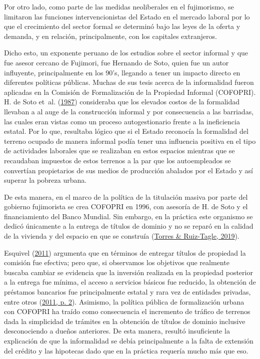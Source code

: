 \documentclass[
  letterpaper,
  12pt,
  oneside,
  spanish,
  doublespacing,
  headsepline,
  parskip]{MastersDoctoralThesis}
\begin{document}
Por otro lado, como parte de las medidas neoliberales en el fujimorismo,
se limitaron las funciones intervencionistas del Estado en el mercado
laboral por lo que el crecimiento del sector formal se determinó bajo
las leyes de la oferta y demanda, y en relación, principalmente, con los
capitales extranjeros.

Dicho esto, un exponente peruano de los estudios sobre el sector
informal y que fue asesor cercano de Fujimori, fue Hernando de Soto,
quien fue un autor influyente, principalmente en los 90's, llegando a
tener un impacto directo en diferentes políticas públicas. Muchas de sus
tesis acerca de la informalidad fueron aplicadas en la Comisión de
Formalización de la Propiedad Informal (COFOPRI). H. de Soto et~al.
(\protect\hyperlink{ref-desoto1987}{1987}) consideraba que los elevados
costos de la formalidad llevaban a al auge de la construcción informal y
por consecuencia a las barriadas, las cuales eran vistas como un proceso
autogestionario frente a la ineficiencia estatal. Por lo que, resultaba
lógico que si el Estado reconocía la formalidad del terreno ocupado de
manera informal podía tener una influencia positiva en el tipo de
actividades laborales que se realizaban en estos espacios mientras que
se recaudaban impuestos de estos terrenos a la par que los autoempleados
se convertían propietarios de sus medios de producción abalados por el
Estado y así superar la pobreza urbana.

De esta manera, en el marco de la política de la titulación masiva por
parte del gobierno fujimorista se crea COFOPRI en 1996, con asesoría de
H. de Soto y el financiamiento del Banco Mundial. Sin embargo, en la
práctica este organismo se dedicó únicamente a la entrega de títulos de
dominio y no se reparó en la calidad de la vivienda y del espacio en que
se construía (\protect\hyperlink{ref-torres2019}{Torres \& Ruiz-Tagle,
2019}).

Esquivel (\protect\hyperlink{ref-esquivel2011}{2011}) argumenta que en
términos de entregar títulos de propiedad la comisión fue efectiva; pero
que, si observamos los objetivos que realmente buscaba cambiar se
evidencia que la inversión realizada en la propiedad posterior a la
entrega fue mínima, el acceso a servicios básicos fue reducido, la
obtención de préstamos bancarios fue principalmente estatal y rara vez
de entidades privadas, entre otros
(\protect\hyperlink{ref-esquivel2011}{2011, p. 2}). Asimismo, la
política pública de formalización urbana con COFOPRI ha traído como
consecuencia el incremento de tráfico de terrenos dada la simplicidad de
trámites en la obtención de títulos de dominio inclusive desconociendo a
dueños anteriores. De esta manera, resultó insuficiente la explicación
de que la informalidad se debía principalmente a la falta de extensión
del crédito y las hipotecas dado que en la práctica requería mucho más
que eso.
\end{document}
